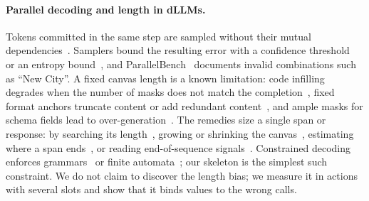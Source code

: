 \paragraph{Parallel decoding and length in dLLMs.} Tokens committed in the same step are sampled without their mutual dependencies~\cite{liu2025copula}. Samplers bound the resulting error with a confidence threshold~\cite{wu2026fastdllm} or an entropy bound~\cite{benhamu2025ebsampler}, and ParallelBench~\cite{kang2026parallelbench} documents invalid combinations such as ``New City''. A fixed canvas length is a known limitation: code infilling degrades when the number of masks does not match the completion~\cite{wu2026dreamon}, fixed format anchors truncate content or add redundant content~\cite{han2026dia}, and ample masks for schema fields lead to over-generation~\cite{xiong2026s3}. The remedies size a single span or response: by searching its length~\cite{liu2026cal}, growing or shrinking the canvas~\cite{wu2026dreamon}, estimating where a span ends~\cite{han2026dia}, or reading end-of-sequence signals~\cite{yang2026rhoeos,li2026daedal}. Constrained decoding enforces grammars~\cite{mundler2026cfg,geng2023grammar} or finite automata~\cite{dang2026constrained}; our skeleton is the simplest such constraint. We do not claim to discover the length bias; we measure it in actions with several slots and show that it binds values to the wrong calls.

